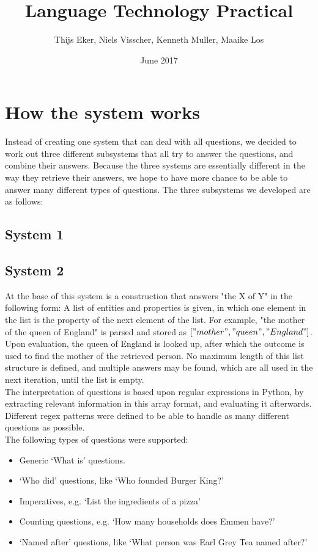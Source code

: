 \documentclass{article}
\title{Language Technology Practical}
\author{Thijs Eker, Niels Visscher, Kenneth Muller, Maaike Los }
\date{June 2017}
\begin{document}
\maketitle

\section{How the system works}
Instead of creating one system that can deal with all questions, we decided to work out three different subsystems that all try to answer the questions, and combine their answers. Because the three systems are essentially different in the way they retrieve their answers, we hope to have more chance to be able to answer many different types of questions. The three subsystems we developed are as follows:
\subsection*{System 1}

\subsection*{System 2}

At the base of this system is a construction that answers "the X of Y" in the following form: A list of entities and properties is given, in which one element in the list is the property of the next element of the list. For example, "the mother of the queen of England" is parsed and stored as $["mother", "queen", "England"]$. Upon evaluation, the queen of England is looked up, after which the outcome is used to find the mother of the retrieved person. No maximum length of this list structure is defined, and multiple answers may be found, which are all used in the next iteration, until the list is empty.\\

The interpretation of questions is based upon regular expressions in Python, by extracting relevant information in this array format, and evaluating it afterwards. Different regex patterns were defined to be able to handle as many different questions as possible.\\

The following types of questions were supported:\\

\begin{itemize}
	\item Generic `What is' questions.
	\item `Who did' questions, like `Who founded Burger King?'
	\item Imperatives, e.g. `List the ingredients of a pizza'
	\item Counting questions, e.g. `How many households does Emmen have?'
	\item `Named after' questions, like `What person was Earl Grey Tea named after?'
\end{itemize}
\end{document}
